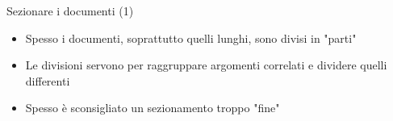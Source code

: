 \begin{frame}{Sezionare i documenti (1)}

\vspace*{20pt}

\begin{itemize}

	\item Spesso i documenti, soprattutto quelli lunghi, sono divisi in "parti"
	\item Le divisioni servono per raggruppare argomenti correlati e dividere
	quelli differenti
	\item Spesso è sconsigliato un sezionamento troppo "fine"

\end{itemize}

\end{frame}
